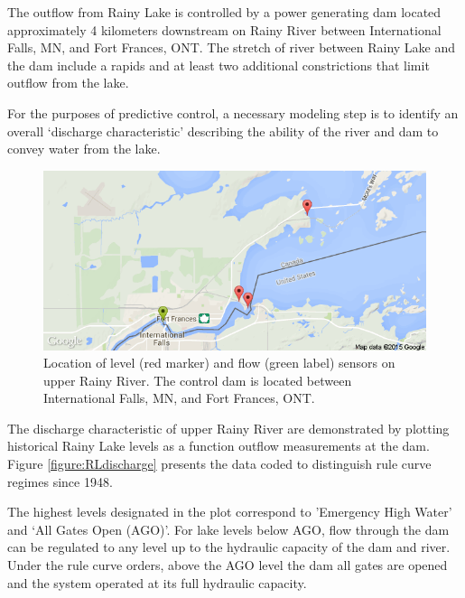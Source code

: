 \documentclass[preprint,times]{elsarticle}
\begin{document}
The outflow from Rainy Lake is controlled by a power generating dam located approximately 4 kilometers downstream on Rainy River between International Falls, MN, and Fort Frances, ONT. The stretch of river between Rainy Lake and the dam include a rapids and at least two additional constrictions that limit outflow from the lake. 

For the purposes of predictive control, a necessary modeling step is to identify an overall `discharge characteristic' describing the ability of the river and dam to convey water from the lake.

\begin{figure}
\includegraphics[width=\linewidth]{rlmap}
\caption{Location of level (red marker) and flow (green label) sensors on upper Rainy River. The control dam is located between International Falls, MN, and Fort Frances, ONT.}\label{figure:8}
\end{figure}

The discharge characteristic of upper Rainy River are demonstrated by plotting historical Rainy Lake levels as a function outflow measurements at the dam. Figure \ref{figure:RLdischarge} presents the data coded to distinguish rule curve regimes since 1948. 

The highest levels designated in the plot correspond to 'Emergency High Water' and `All Gates Open (AGO)'. For lake levels below AGO, flow through the dam can be regulated to any level up to the hydraulic capacity of the dam and river. Under the rule curve orders, above the AGO level the dam all gates are opened and the system operated at its full hydraulic capacity. 
\end{document}
